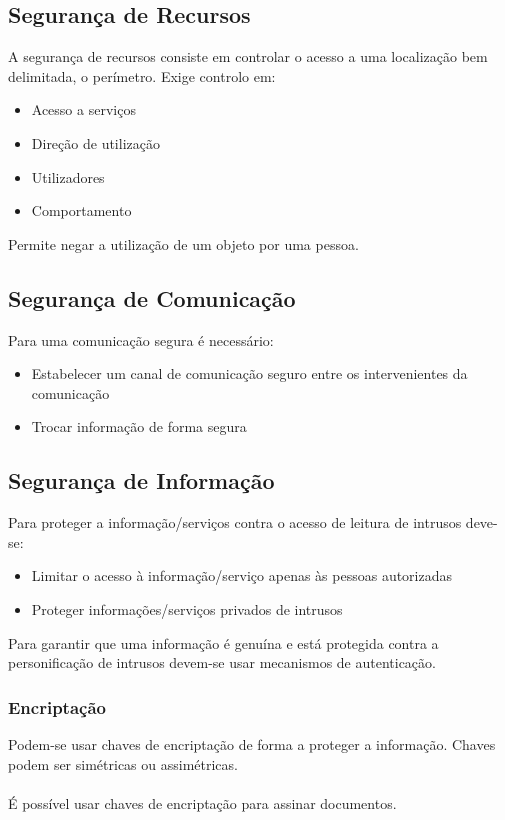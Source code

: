 \documentclass[10pt,a4paper]{report}
\begin{document}
\subsection{Segurança de Recursos}
A segurança de recursos consiste em controlar o acesso a uma localização bem delimitada, o perímetro. Exige controlo em:
\begin{itemize}
\item Acesso a serviços
\item Direção de utilização
\item Utilizadores
\item Comportamento
\end{itemize}
Permite negar a utilização de um objeto por uma pessoa.
\subsection{Segurança de Comunicação}
Para uma comunicação segura é necessário:
\begin{itemize}
\item Estabelecer um canal de comunicação seguro entre os intervenientes da comunicação
\item Trocar informação de forma segura
\end{itemize} 
\subsection{Segurança de Informação}
Para proteger a informação/serviços contra o acesso de leitura de intrusos deve-se:
\begin{itemize}
\item Limitar o acesso à informação/serviço apenas às pessoas autorizadas
\item Proteger informações/serviços privados de intrusos
\end{itemize}
Para garantir que uma informação é genuína e está protegida contra a personificação de intrusos devem-se usar mecanismos de autenticação.
\subsubsection{Encriptação}
Podem-se usar chaves de encriptação de forma a proteger a informação. Chaves podem ser simétricas ou assimétricas.\\
\\
É possível usar chaves de encriptação para assinar documentos.
\end{document}
